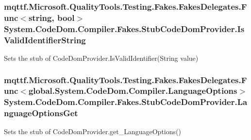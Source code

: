\hypertarget{class_system_1_1_code_dom_1_1_compiler_1_1_fakes_1_1_stub_code_dom_provider_a56866b1e6496739a3a03e1180ec73b42}{
\subsubsection[{Is\-Valid\-Identifier\-String}]{\setlength{\rightskip}{0pt plus 5cm}mqttf.\-Microsoft.\-Quality\-Tools.\-Testing.\-Fakes.\-Fakes\-Delegates.\-Func$<$string, bool$>$ System.\-Code\-Dom.\-Compiler.\-Fakes.\-Stub\-Code\-Dom\-Provider.\-Is\-Valid\-Identifier\-String}}\label{class_system_1_1_code_dom_1_1_compiler_1_1_fakes_1_1_stub_code_dom_provider_a56866b1e6496739a3a03e1180ec73b42}


Sets the stub of Code\-Dom\-Provider.\-Is\-Valid\-Identifier(\-String value)

\hypertarget{class_system_1_1_code_dom_1_1_compiler_1_1_fakes_1_1_stub_code_dom_provider_a2cfd6ecb6f692f37760bd3f7b02d6b7d}{
\subsubsection[{Language\-Options\-Get}]{\setlength{\rightskip}{0pt plus 5cm}mqttf.\-Microsoft.\-Quality\-Tools.\-Testing.\-Fakes.\-Fakes\-Delegates.\-Func$<$global.\-System.\-Code\-Dom.\-Compiler.\-Language\-Options$>$ System.\-Code\-Dom.\-Compiler.\-Fakes.\-Stub\-Code\-Dom\-Provider.\-Language\-Options\-Get}}\label{class_system_1_1_code_dom_1_1_compiler_1_1_fakes_1_1_stub_code_dom_provider_a2cfd6ecb6f692f37760bd3f7b02d6b7d}


Sets the stub of Code\-Dom\-Provider.\-get\-\_\-\-Language\-Options()

